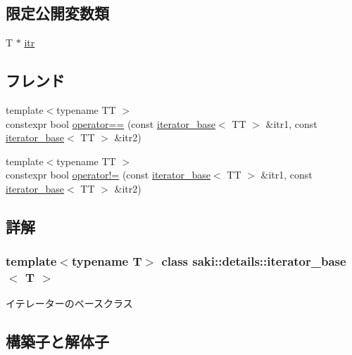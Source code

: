 \subsection*{限定公開変数類}
\begin{DoxyCompactItemize}
\item 
T $\ast$ \mbox{\hyperlink{classsaki_1_1details_1_1iterator__base_a26c42413a1c967669da4a52b1fe65f13}{itr}}
\end{DoxyCompactItemize}
\subsection*{フレンド}
\begin{DoxyCompactItemize}
\item 
{\footnotesize template$<$typename TT $>$ }\\constexpr bool \mbox{\hyperlink{classsaki_1_1details_1_1iterator__base_a6ac6c0419a9e263f0f89741137499a83}{operator==}} (const \mbox{\hyperlink{classsaki_1_1details_1_1iterator__base}{iterator\+\_\+base}}$<$ TT $>$ \&itr1, const \mbox{\hyperlink{classsaki_1_1details_1_1iterator__base}{iterator\+\_\+base}}$<$ TT $>$ \&itr2)
\item 
{\footnotesize template$<$typename TT $>$ }\\constexpr bool \mbox{\hyperlink{classsaki_1_1details_1_1iterator__base_a347d4c8755f8c350aa9c0151165549f2}{operator!=}} (const \mbox{\hyperlink{classsaki_1_1details_1_1iterator__base}{iterator\+\_\+base}}$<$ TT $>$ \&itr1, const \mbox{\hyperlink{classsaki_1_1details_1_1iterator__base}{iterator\+\_\+base}}$<$ TT $>$ \&itr2)
\end{DoxyCompactItemize}


\subsection{詳解}
\subsubsection*{template$<$typename T$>$\newline
class saki\+::details\+::iterator\+\_\+base$<$ T $>$}

イテレーターのベースクラス 

\subsection{構築子と解体子}
\mbox{\label{classsaki_1_1details_1_1iterator__base_a8fc711c3742cad39433fc3de560900f8}} 
